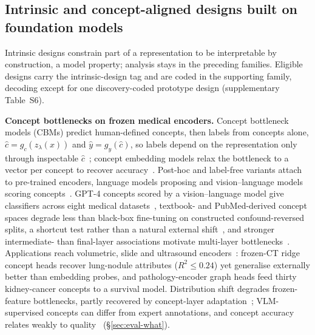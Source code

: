 \subsection{Intrinsic and concept-aligned designs built on foundation models}
\label{sec:intrinsic}

Intrinsic designs constrain part of a representation to be interpretable by construction, a model
property; analysis stays in the preceding families. Eligible designs carry the intrinsic-design tag and are
coded in the supporting family, decoding except for one discovery-coded prototype design (supplementary
Table~S6).

\textbf{Concept bottlenecks on frozen medical encoders.} Concept bottleneck models (CBMs) predict
human-defined concepts, then labels from concepts alone, $\hat c=g_c(z_\lambda(x))$ and $\hat y=g_y(\hat c)$,
so labels depend on the representation only through inspectable $\hat c$~\cite{koh2020concept}; concept
embedding models relax the bottleneck to a vector per concept to recover accuracy~\cite{zarlenga2022concept}.
Post-hoc and label-free variants attach to pre-trained encoders, language models proposing and vision--language models
scoring concepts~\cite{yuksekgonul2022post,oikarinen2023label,yang2022language}. GPT-4 concepts scored by
a vision--language model give classifiers across eight medical datasets~\cite{yan2023robust}, textbook-
and PubMed-derived concept spaces degrade less than black-box fine-tuning on constructed confound-reversed
splits, a shortcut test rather than a natural external shift~\cite{yang2024textbook}, and stronger
intermediate- than final-layer associations motivate multi-layer bottlenecks~\cite{wang2025mvp}.
Applications reach volumetric, slide and ultrasound
encoders~\cite{rojas2026echopcbm,tushar2026distilling,gao2025evaluating,sun2025label}: frozen-CT ridge
concept heads recover lung-nodule attributes ($R^2\le 0.24$) yet generalise externally better than
embedding probes, and pathology-encoder graph heads feed thirty kidney-cancer concepts to a survival
model. Distribution shift degrades frozen-feature bottlenecks, partly recovered by concept-layer
adaptation~\cite{choi2024adaptive}; VLM-supervised concepts can differ from expert annotations, and
concept accuracy relates weakly to quality~\cite{debole2025if} (\S\ref{sec:eval-what}).

